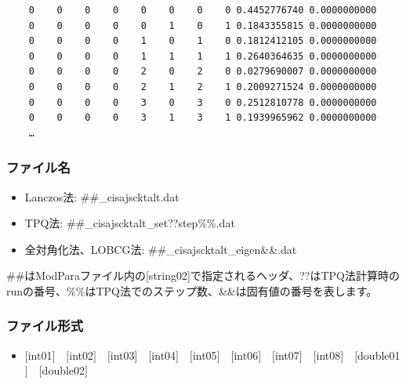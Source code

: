 \begin{minipage}{15cm}
\begin{screen}
\begin{verbatim}
    0    0    0    0    0    0    0    0 0.4452776740 0.0000000000
    0    0    0    0    0    1    0    1 0.1843355815 0.0000000000
    0    0    0    0    1    0    1    0 0.1812412105 0.0000000000
    0    0    0    0    1    1    1    1 0.2640364635 0.0000000000
    0    0    0    0    2    0    2    0 0.0279690007 0.0000000000
    0    0    0    0    2    1    2    1 0.2009271524 0.0000000000
    0    0    0    0    3    0    3    0 0.2512810778 0.0000000000
    0    0    0    0    3    1    3    1 0.1939965962 0.0000000000
    …
\end{verbatim}
\end{screen}
\end{minipage}

\subsubsection{ファイル名}
 \begin{itemize}
   \item{Lanczos法:}  \#\#\_cisajscktalt.dat
   \item{TPQ法:} \#\#\_cisajscktalt\_set??step\%\%.dat
   \item{全対角化法、LOBCG法:}  \#\#\_cisajscktalt\_eigen{\&\&}.dat
  \end{itemize}
  \#\#はModParaファイル内の[string02]で指定されるヘッダ、??はTPQ法計算時のrunの番号、\%\%はTPQ法でのステップ数、\&\&は固有値の番号を表します。


\subsubsection{ファイル形式}
 \begin{itemize}
   \item  $[$int01$]$~~$[$int02$]$~~$[$int03$]$~~$[$int04$]$~~$[$int05$]$~~$[$int06$]$~~$[$int07$]$~~$[$int08$]$~~$[$double01$]$~~$[$double02$]$
  \end{itemize}
